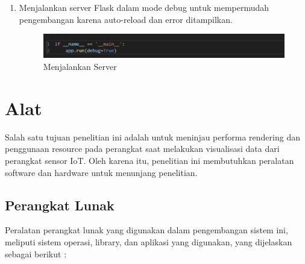 \begin{enumerate}[label={\alph*.}]
\begin{enumerate}[label={\arabic*.}]
\begin{figure}[H]
			\label{Membuat Endpoint}
		\end{figure}
		\item Menjalankan server Flask dalam mode debug untuk mempermudah pengembangan karena auto-reload dan error ditampilkan.
		\begin{figure}[H]
			\centering
			\includegraphics[width=0.8\linewidth]{gambar/Metodologi/run.png}
			\caption{Menjalankan Server}
			\label{Menjalankan Server}
		\end{figure}
		
	\end{enumerate}
\end{enumerate}

\section{Alat}
Salah satu tujuan penelitian ini adalah untuk meninjau performa rendering dan penggunaan resource pada perangkat saat melakukan visualisasi data dari perangkat sensor IoT. Oleh karena itu, penelitian ini membutuhkan peralatan software dan hardware untuk menunjang penelitian.
\subsection{Perangkat Lunak}
Peralatan perangkat lunak yang digunakan dalam pengembangan sistem ini, meliputi sistem operasi, library, dan aplikasi yang digunakan, yang dijelaskan sebagai berikut :  

